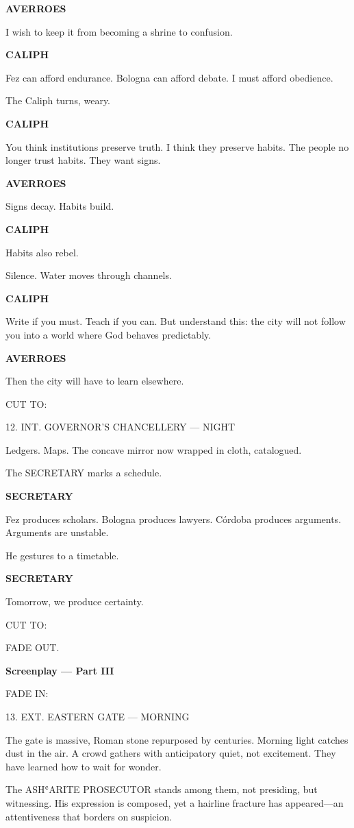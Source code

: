 \documentclass[12pt]{article}
\newlength{\charindent}
\newlength{\dialogueindent}
\newlength{\dialoguewidth}
\newlength{\transitionindent}
\newcommand{\sectionhead}[1]{\vspace{1em}\textbf{#1}\vspace{0.25em}}
\newcommand{\slug}[1]{\vspace{1.25em}\textsc{#1}\vspace{0.5em}}
\newcommand{\action}[1]{#1}
\newcommand{\character}[1]{%
  \par\vspace{0.75em}%
  \hspace*{\charindent}\textbf{#1}%
}
\newcommand{\dialogue}[1]{%
  \par\nobreak
  \hspace*{\dialogueindent}%
  \begin{minipage}[t]{\dialoguewidth}
  #1
  \end{minipage}
}
\newcommand{\transition}[1]{%
  \par\vspace{1em}%
  \hspace*{\transitionindent}\textsc{#1}%
}
\begin{document}
\character{AVERROES}
\dialogue{I wish to keep it from becoming a shrine to confusion.}

\character{CALIPH}
\dialogue{Fez can afford endurance. Bologna can afford debate. I must afford obedience.}

\action{The Caliph turns, weary.}

\character{CALIPH}
\dialogue{You think institutions preserve truth. I think they preserve habits. The people no longer trust habits. They want signs.}

\character{AVERROES}
\dialogue{Signs decay. Habits build.}

\character{CALIPH}
\dialogue{Habits also rebel.}

\action{Silence. Water moves through channels.}

\character{CALIPH}
\dialogue{Write if you must. Teach if you can. But understand this: the city will not follow you into a world where God behaves predictably.}

\character{AVERROES}
\dialogue{Then the city will have to learn elsewhere.}

\transition{CUT TO:}

\slug{12. INT. GOVERNOR'S CHANCELLERY --- NIGHT}

\action{Ledgers. Maps. The concave mirror now wrapped in cloth, catalogued.}

\action{The SECRETARY marks a schedule.}

\character{SECRETARY}
\dialogue{Fez produces scholars. Bologna produces lawyers. Córdoba produces arguments. Arguments are unstable.}

\action{He gestures to a timetable.}

\character{SECRETARY}
\dialogue{Tomorrow, we produce certainty.}

\transition{CUT TO:}

\slug{FADE OUT.}

\sectionhead{Screenplay — Part III}

\slug{FADE IN:}

\slug{13. EXT. EASTERN GATE --- MORNING}

\action{The gate is massive, Roman stone repurposed by centuries. Morning light catches dust in the air. A crowd gathers with anticipatory quiet, not excitement. They have learned how to wait for wonder.}

\action{The ASHʿARITE PROSECUTOR stands among them, not presiding, but witnessing. His expression is composed, yet a hairline fracture has appeared—an attentiveness that borders on suspicion.}
\end{document}
